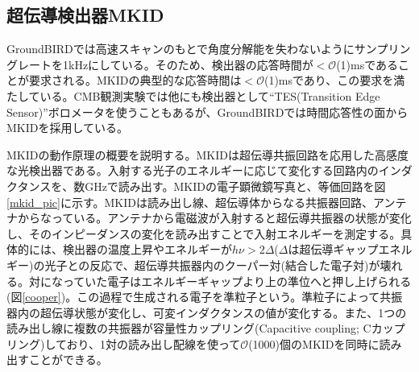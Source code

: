 \subsection{超伝導検出器MKID}
GroundBIRDでは高速スキャンのもとで角度分解能を失わないようにサンプリングレートを1kHzにしている。そのため、検出器の応答時間が$< \mathcal{O}$(1)msであることが要求される。MKIDの典型的な応答時間は$< \mathcal{O}$(1)msであり\cite{MKID_res}、この要求を満たしている。CMB観測実験では他にも検出器として``TES(Transition Edge Sensor)''ボロメータを使うこともあるが、GroundBIRDでは時間応答性の面からMKIDを採用している。

MKIDの動作原理の概要を説明する。MKIDは超伝導共振回路を応用した高感度な光検出器である。入射する光子のエネルギーに応じて変化する回路内のインダクタンスを、数GHzで読み出す。MKIDの電子顕微鏡写真\cite{MKID_pic}と、等価回路を図\ref{mkid_pic}に示す。MKIDは読み出し線、超伝導体からなる共振器回路、アンテナからなっている。アンテナから電磁波が入射すると超伝導共振器の状態が変化し、そのインピーダンスの変化を読み出すことで入射エネルギーを測定する。具体的には、検出器の温度上昇やエネルギーが$h\nu > 2\Delta$($\Delta$は超伝導ギャップエネルギー)の光子との反応で、超伝導共振器内のクーパー対(結合した電子対)が壊れる。対になっていた電子はエネルギーギャップより上の準位へと押し上げられる(図\ref{cooper})。この過程で生成される電子を準粒子という。準粒子によって共振器内の超伝導状態が変化し、可変インダクタンスの値が変化する。また、1つの読み出し線に複数の共振器が容量性カップリング(Capacitive coupling; Cカップリング)しており、1対の読み出し配線を使って$\mathcal{O}$(1000)個のMKIDを同時に読み出すことができる。

